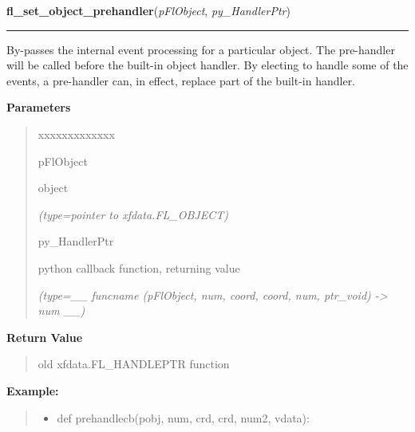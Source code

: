 \hspace{.8\funcindent}\begin{boxedminipage}{\funcwidth}

    \raggedright \textbf{fl\_set\_object\_prehandler}(\textit{pFlObject}, \textit{py\_HandlerPtr})

    \vspace{-1.5ex}

    \rule{\textwidth}{0.5\fboxrule}
\setlength{\parskip}{2ex}
    By-passes the internal event processing for a particular object. The 
    pre-handler will be called before the built-in object handler. By 
    electing to handle some of the events, a pre-handler can, in effect, 
    replace part of the built-in handler.

\setlength{\parskip}{1ex}
      \textbf{Parameters}
      \vspace{-1ex}

      \begin{quote}
        \begin{Ventry}{xxxxxxxxxxxxx}

          \item[pFlObject]

          object

            {\it (type=pointer to xfdata.FL\_OBJECT)}

          \item[py\_HandlerPtr]

          python callback function, returning value

            {\it (type=\_\_ funcname (pFlObject, num, coord, coord, num, ptr\_void) 
-{\textgreater} num \_\_)}

        \end{Ventry}

      \end{quote}

      \textbf{Return Value}
    \vspace{-1ex}

      \begin{quote}
      old xfdata.FL\_HANDLEPTR function

      \end{quote}

\textbf{Example:}
\begin{quote}
  \begin{itemize}

  \item
    \setlength{\parskip}{0.6ex}
def prehandlecb(pobj, num, crd, crd, num2, vdata):




\end{itemize}
\end{quote}
\end{boxedminipage}

